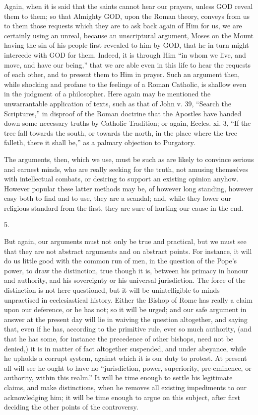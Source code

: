 Again, when it is said that the saints cannot
hear our prayers, unless GOD
reveal them to them; so that Almighty GOD,
upon the Roman theory, conveys from us to them those requests which
they are to ask back again of Him for us, we are certainly using an
unreal, because an unscriptural argument, Moses on the Mount having
the sin of his people first revealed to him by GOD,
that he in turn might intercede with GOD
for them. Indeed, it is through Him ``in whom we live, and move, and
have our being,'' that we are able even in this life to hear the
requests of each other, and to present them to Him in prayer. Such an
argument then, while shocking and profane to the feelings of a Roman
Catholic, is shallow even in the judgment of a philosopher. Here again
may be mentioned the unwarrantable application of texts, such as that
of John v. 39, ``Search the Scriptures,'' in disproof of the Roman
doctrine that the Apostles have handed down some necessary truths by
Catholic Tradition; or again, Eccles. xi. 3, ``If the tree fall towards
the south, or towards the north, in the place where the tree falleth,
there it shall be,'' as a palmary objection to Purgatory.

The arguments, then, which we use, must be such
as are likely to convince serious and earnest minds, who are really
seeking for the truth, not amusing themselves with intellectual
combats, or desiring to support an existing opinion anyhow. However
popular these latter methods may be, of however long standing, however
easy both to find and to use, they are a scandal; and, while they
lower our religious standard from the first, they are sure of hurting
our cause in the end.

5.

But again, our arguments must not only be true
and practical, but we must see that they are not abstract arguments
and on abstract points. For instance, it will do us little good with
the common run of men, in the question of the Pope's power, to draw
the distinction, true though it is, between his primacy in honour and
authority, and his sovereignty or his universal jurisdiction. The
force of the distinction is not here questioned, but it will be
unintelligible to minds unpractised in ecclesiastical history. Either
the Bishop of Rome has really a claim upon our deference, or he has
not; so it will be urged; and our safe argument in answer at the
present day will lie in waiving the question altogether, and saying
that, even if he has, according to the primitive rule, ever so much
authority, (and that he has some, for instance the precedence of other
bishops, need not be denied,) it is in matter of fact altogether
suspended, and under abeyance, while he upholds a corrupt system,
against which it is our duty to protest. At present all will see
he ought to have no ``jurisdiction, power, superiority, pre-eminence,
or authority, within this realm.'' It will be time enough to settle his
legitimate claims, and make distinctions, when he removes all existing
impediments to our acknowledging him; it will be time enough to argue
on this subject, after first deciding the other points of the
controversy.

